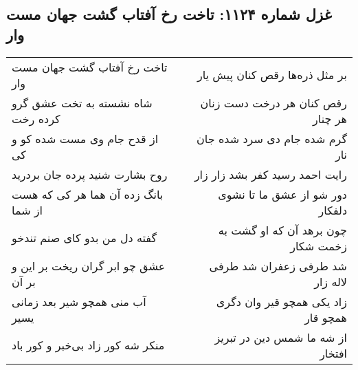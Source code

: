\begin{center}
\section*{غزل شماره ۱۱۲۴: تاخت رخ آفتاب گشت جهان مست وار}
\label{sec:1124}
\begin{longtable}{l p{0.5cm} r}
تاخت رخ آفتاب گشت جهان مست وار
&&
بر مثل ذره‌ها رقص کنان پیش یار
\\
شاه نشسته به تخت عشق گرو کرده رخت
&&
رقص کنان هر درخت دست زنان هر چنار
\\
از قدح جام وی مست شده کو و کی
&&
گرم شده جام دی سرد شده جان نار
\\
روح بشارت شنید پرده جان بردرید
&&
رایت احمد رسید کفر بشد زار زار
\\
بانگ زده آن هما هر کی که هست از شما
&&
دور شو از عشق ما تا نشوی دلفکار
\\
گفته دل من بدو کای صنم تندخو
&&
چون برهد آن که او گشت به زخمت شکار
\\
عشق چو ابر گران ریخت بر این و بر آن
&&
شد طرفی زعفران شد طرفی لاله زار
\\
آب منی همچو شیر بعد زمانی یسیر
&&
زاد یکی همچو قیر وان دگری همچو قار
\\
منکر شه کور زاد بی‌خبر و کور باد
&&
از شه ما شمس دین در تبریز افتخار
\\
\end{longtable}
\end{center}
